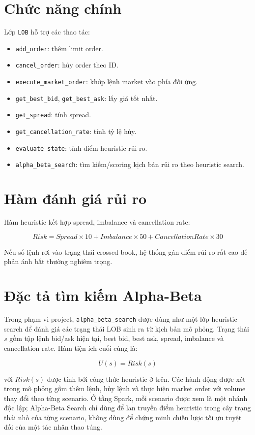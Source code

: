 \documentclass[12pt,a4paper]{report}
\begin{document}
\section{Chức năng chính}

Lớp \texttt{LOB} hỗ trợ các thao tác:

\begin{itemize}
    \item \texttt{add\_order}: thêm limit order.
    \item \texttt{cancel\_order}: hủy order theo ID.
    \item \texttt{execute\_market\_order}: khớp lệnh market vào phía đối ứng.
    \item \texttt{get\_best\_bid}, \texttt{get\_best\_ask}: lấy giá tốt nhất.
    \item \texttt{get\_spread}: tính spread.
    \item \texttt{get\_cancellation\_rate}: tính tỷ lệ hủy.
    \item \texttt{evaluate\_state}: tính điểm heuristic rủi ro.
    \item \texttt{alpha\_beta\_search}: tìm kiếm/scoring kịch bản rủi ro theo heuristic search.
\end{itemize}

\section{Hàm đánh giá rủi ro}

Hàm heuristic kết hợp spread, imbalance và cancellation rate:

\[
Risk = Spread \times 10 + Imbalance \times 50 + CancellationRate \times 30
\]

Nếu sổ lệnh rơi vào trạng thái crossed book, hệ thống gán điểm rủi ro rất cao để phản ánh bất thường nghiêm trọng.

\section{Đặc tả tìm kiếm Alpha-Beta}

Trong phạm vi project, \texttt{alpha\_beta\_search} được dùng như một lớp heuristic search để đánh giá các trạng thái LOB sinh ra từ kịch bản mô phỏng. Trạng thái \(s\) gồm tập lệnh bid/ask hiện tại, best bid, best ask, spread, imbalance và cancellation rate. Hàm tiện ích cuối cùng là:

\[
U(s)=Risk(s)
\]

với \(Risk(s)\) được tính bởi công thức heuristic ở trên. Các hành động được xét trong mô phỏng gồm thêm lệnh, hủy lệnh và thực hiện market order với volume thay đổi theo từng scenario. Ở tầng Spark, mỗi scenario được xem là một nhánh độc lập; Alpha-Beta Search chỉ dùng để lan truyền điểm heuristic trong cây trạng thái nhỏ của từng scenario, không dùng để chứng minh chiến lược tối ưu tuyệt đối của một tác nhân thao túng.
\end{document}
